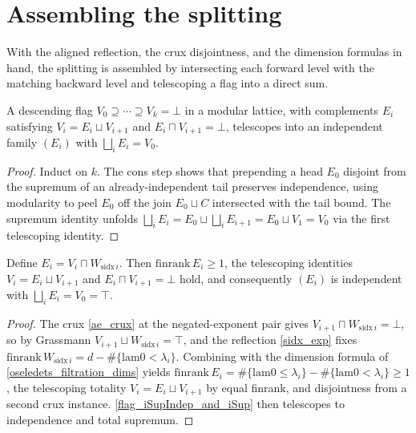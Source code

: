 \section{Assembling the splitting}

With the aligned reflection, the crux disjointness, and the dimension formulas in hand, the splitting is assembled by intersecting each forward level with the matching backward level and telescoping a flag into a direct sum.

\begin{lemma}\label{flag_iSupIndep_and_iSup}
  A descending flag \(V_0 \supseteq \cdots \supseteq V_k = \bot\) in a modular lattice, with complements \(E_i\) satisfying \(V_i = E_i \sqcup V_{i+1}\) and \(E_i \sqcap V_{i+1} = \bot\), telescopes into an independent family \((E_i)\) with \(\bigsqcup_i E_i = V_0\).
\end{lemma}
\begin{proof}\leanok
  Induct on \(k\). The cons step shows that prepending a head \(E_0\) disjoint from the supremum of an already-independent tail preserves independence, using modularity to peel \(E_0\) off the join \(E_0 \sqcup C\) intersected with the tail bound. The supremum identity unfolds \(\bigsqcup_{i} E_i = E_0 \sqcup \bigsqcup_i E_{i+1} = E_0 \sqcup V_1 = V_0\) via the first telescoping identity.
\end{proof}

\begin{proposition}\label{esplitAt}
  \leanok
  Define \(E_i = V_i \sqcap W_{\mathrm{sidx}\,i}\). Then \(\mathrm{finrank}\,E_i \ge 1\), the telescoping identities \(V_i = E_i \sqcup V_{i+1}\) and \(E_i \sqcap V_{i+1} = \bot\) hold, and consequently \((E_i)\) is independent with \(\bigsqcup_i E_i = V_0 = \top\).
\end{proposition}
\begin{proof}\leanok
  The crux \cref{ae_crux} at the negated-exponent pair gives \(V_{i+1} \sqcap W_{\mathrm{sidx}\,i} = \bot\), so by Grassmann \(V_{i+1} \sqcup W_{\mathrm{sidx}\,i} = \top\), and the reflection \cref{sidx_exp} fixes \(\mathrm{finrank}\,W_{\mathrm{sidx}\,i} = d - \#\{\mathrm{lam0} < \lambda_i\}\). Combining with the dimension formula of \cref{oseledets_filtration_dims} yields \(\mathrm{finrank}\,E_i = \#\{\mathrm{lam0} \le \lambda_i\} - \#\{\mathrm{lam0} < \lambda_i\} \ge 1\), the telescoping totality \(V_i = E_i \sqcup V_{i+1}\) by equal finrank, and disjointness from a second crux instance. \cref{flag_iSupIndep_and_iSup} then telescopes to independence and total supremum.
\end{proof}

